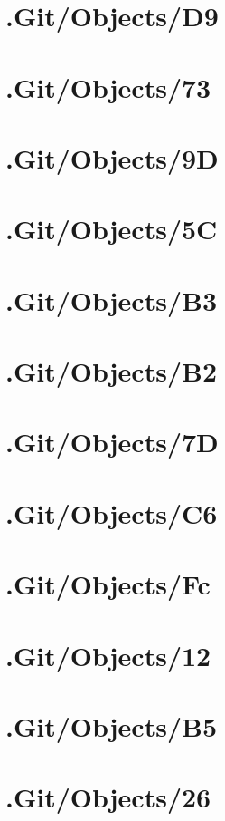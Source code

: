 \section*{.Git/Objects/D9}

\section*{.Git/Objects/73}

\section*{.Git/Objects/9D}

\section*{.Git/Objects/5C}

\section*{.Git/Objects/B3}

\section*{.Git/Objects/B2}

\section*{.Git/Objects/7D}

\section*{.Git/Objects/C6}

\section*{.Git/Objects/Fc}

\section*{.Git/Objects/12}

\section*{.Git/Objects/B5}

\section*{.Git/Objects/26}

